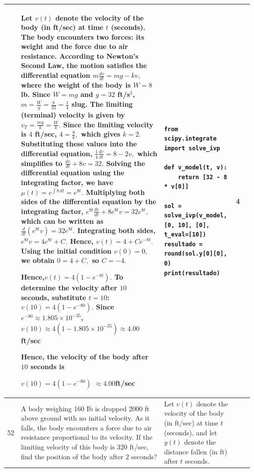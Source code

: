 \documentclass[a4paper,12pt]{article}
\begin{document}
\begin{longtable}{|p{0.3cm}|p{}|p{10cm}|p{}|p{1.5cm}|}
              &Let $v(t)$ denote the velocity of the body (in ft/sec) at time $t$ (seconds).
The body encounters two forces: its weight and the force due to air resistance. According to Newton's Second Law, the motion satisfies the differential equation $m\frac{dv}{dt}=mg-kv,$ where the weight of the body is $W=8$ lb. Since $W=mg$ and $g=32$ ft/s$^2$,
$m=\frac{W}{g}=\frac{8}{32}=\frac{1}{4}$ slug.
The limiting (terminal) velocity is given by
$v_T=\frac{mg}{k}=\frac{W}{k}.$
Since the limiting velocity is $4$ ft/sec,
$4=\frac{8}{k},$ which gives $k=2.$
Substituting these values into the differential equation, $\frac{1}{4}\frac{dv}{dt}=8-2v,$
which simplifies to $\frac{dv}{dt}+8v=32.$
Solving the differential equation using the integrating factor, we have
$\mu(t)=e^{\int 8\,dt}=e^{8t}.$
Multiplying both sides of the differential equation by the integrating factor,
$e^{8t}\frac{dv}{dt}+8e^{8t}v=32e^{8t},$
which can be written as
$\frac{d}{dt}\left(e^{8t}v\right)=32e^{8t}.$
Integrating both sides,
$e^{8t}v=4e^{8t}+C.$ Hence, $v(t)=4+Ce^{-8t}.$
Using the initial condition
$v(0)=0,$ we obtain $0=4+C,$ so $C=-4.$

Hence,$v(t)=4\left(1-e^{-8t}\right).$
To determine the velocity after $10$ seconds, substitute $t=10$: $v(10)=4\left(1-e^{-80}\right).$
Since $e^{-80}\approx1.805\times10^{-35}$,
$v(10)\approx4(1-1.805\times10^{-35})
\approx4.00$ft/sec

Hence, the velocity of the body after $10$ seconds is

$v(10)=4\left(1-e^{-80}\right)$ $\approx4.00 $ft/sec

 &\begin{verbatim}
from scipy.integrate import solve_ivp

def v_model(t, v):
    return [32 - 8 * v[0]]

sol = solve_ivp(v_model, [0, 10], [0], t_eval=[10])
resultado = round(sol.y[0][0], 0)
print(resultado)
\end{verbatim}& 4 \\ \hline 
  
 52           & A body weighing 160 Ib is dropped 2000 ft above ground with no initial velocity. As it falls, the body encounters a force due to air resistance proportional to its velocity. If the limiting velocity of this body is 320 ft/sec, find the position of the body after 2 seconds?


              &Let $v(t)$ denote the velocity of the body (in ft/sec) at time $t$ (seconds), and let $y(t)$ denote the distance fallen (in ft) after $t$ seconds.


\end{longtable}
\end{document}
